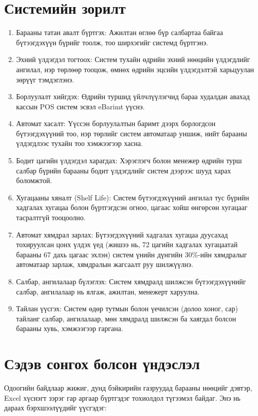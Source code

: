 \section{Системийн зорилт}
\begin{enumerate}
    \item Барааны татан авалт бүртгэх: Ажилтан өглөө бүр салбартаа байгаа бүтээгдэхүүн бүрийг тоолж, тоо ширхэгийг системд бүртгэнэ. 
    \item Эхний үлдэгдэл тогтоох: Систем тухайн өдрийн эхний нөөцийн үлдэгдлийг ангилал, нэр төрлөөр тооцож, өмнөх өдрийн эцсийн үлдэгдэлтэй харьцуулан зөрүүг тэмдэглэнэ. 
    \item Борлуулалт хийгдэх: Өдрийн туршид үйлчлүүлэгчид бараа худалдан авахад кассын POS систем эсвэл eBarimt үүснэ. 
    \item Автомат хасалт: Үүссэн борлуулалтын баримт дээрх борлогдсон бүтээгдэхүүний тоо, нэр төрлийг систем автоматаар уншиж, нийт барааны үлдэгдлээс тухайн тоо хэмжээгээр хасна. 
    \item Бодит цагийн үлдэгдэл харагдах: Хэрэглэгч болон менежер өдрийн турш салбар бүрийн барааны бодит үлдэгдлийг систем дээрээс шууд харах боломжтой. 
    \item Хугацааны хяналт (Shelf Life): Систем бүтээгдэхүүний ангилал тус бүрийн хадгалах хугацаа болон бүртгэгдсэн огноо, цагаас хойш өнгөрсөн хугацааг тасралтгүй тооцоолно. 
    \item Автомат хямдрал зарлах: Бүтээгдэхүүний хадгалах хугацаа дуусахад тохируулсан цонх үлдэх үед (жишээ нь, 72 цагийн хадгалах хугацаатай барааны 67 дахь цагаас эхлэн) систем үнийн дүнгийн 30\%-ийн хямдралыг автоматаар зарлаж, хямдралын жагсаалт руу шилжүүлнэ. 
    \item Салбар, ангилалаар бүлэглэх: Систем хямдралд шилжсэн бүтээгдэхүүнийг салбар, ангилалаар нь ялгаж, ажилтан, менежерт харуулна. 
    \item Тайлан үүсгэх: Систем өдөр тутмын болон үечилсэн (долоо хоног, сар) тайланг салбар, ангилалаар, мөн хямдралд шилжсэн ба хаягдал болсон барааны хувь, хэмжээгээр гаргана.
\end{enumerate}

\section{Сэдэв сонгох болсон үндэслэл}
Одоогийн байдлаар жижиг, дунд бэйкирийн газруудад барааны нөөцийг дэвтэр, Excel хүснэгт зэрэг гар аргаар бүртгэдэг тохиолдол түгээмэл байдаг. Энэ нь дараах бэрхшээлүүдийг үүсгэдэг:

